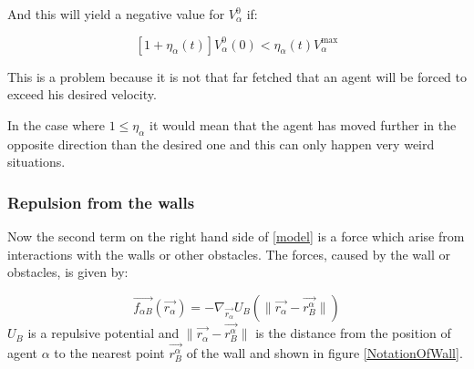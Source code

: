 \begin{itemize}
And this will yield a negative value for $V_{\alpha}^{0}$ if: 

\begin{equation}
\left[ 1 + \eta_{\alpha} \left( t \right) \right] 
V_{\alpha}^{0} \left( 0 \right) < \eta_{\alpha} \left( t \right)V_{\alpha}^{\text{max}} 
\end{equation}

This is a problem because it is not that far fetched that an agent will be 
forced to exceed his desired velocity.

In the case where $1 \leq \eta_{\alpha}$ it would mean that the agent has moved 
further in the opposite direction than the desired one and this can only happen very 
weird situations.
\end{itemize}






\subsubsection{Repulsion from the walls}
Now the second term on the right hand side of \eqref{model} is a force which arise from interactions with the walls or other obstacles. The forces, caused by the wall or obstacles, is given by:

\begin{equation}\label{wallpotential}
    \vec{f_{\alpha B}} \left( \vec{r_{\alpha}} \right) =
    - \nabla_{\vec{r_{\alpha}}} U_{B}
    \left( \| \vec{r_{\alpha}} - \vec{r_{B}^{\alpha}} \| \right)
\end{equation}
$U_B$ is a repulsive potential and $ \| \vec{r_{\alpha}} - \vec{r_{B}^{\alpha}} \|$ is the distance 
from the position of agent $\alpha$ to the nearest point $ \vec{r_{B}^{\alpha}}  $ of the wall and shown in figure \ref{NotationOfWall}.

